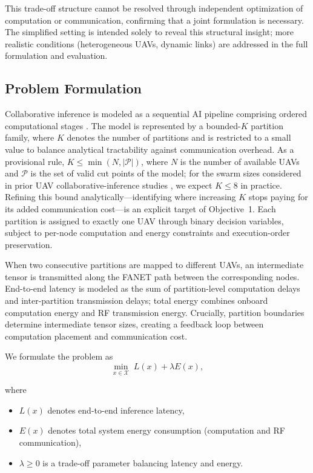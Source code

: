 This trade-off structure cannot be resolved through independent optimization of computation or communication, confirming that a joint formulation is necessary. The simplified setting is intended solely to reveal this structural insight; more realistic conditions (heterogeneous UAVs, dynamic links) are addressed in the full formulation and evaluation.

\subsection*{Problem Formulation}
Collaborative inference is modeled as a sequential AI pipeline comprising ordered computational stages \cite{kang2017neurosurgeon,matsubara2022split}. The model is represented by a bounded-$K$ partition family, where $K$ denotes the number of partitions and is restricted to a small value to balance analytical tractability against communication overhead. As a provisional rule, $K \le \min(N, |\mathcal{P}|)$, where $N$ is the number of available UAVs and $\mathcal{P}$ is the set of valid cut points of the model; for the swarm sizes considered in prior UAV collaborative-inference studies \cite{qu2024elastic,dhuheir2023llhr}, we expect $K \le 8$ in practice. Refining this bound analytically---identifying where increasing $K$ stops paying for its added communication cost---is an explicit target of Objective~1. Each partition is assigned to exactly one UAV through binary decision variables, subject to per-node computation and energy constraints and execution-order preservation.

When two consecutive partitions are mapped to different UAVs, an intermediate tensor is transmitted along the FANET path between the corresponding nodes. End-to-end latency is modeled as the sum of partition-level computation delays and inter-partition transmission delays; total energy combines onboard computation energy and RF transmission energy. Crucially, partition boundaries determine intermediate tensor sizes, creating a feedback loop between computation placement and communication cost.

We formulate the problem as
\[
\min_{x \in \mathcal{X}} \; L(x) + \lambda E(x),
\]

where
\begin{itemize}
    \item $L(x)$ denotes end-to-end inference latency,
    \item $E(x)$ denotes total system energy consumption (computation and RF communication),
    \item $\lambda \geq 0$ is a trade-off parameter balancing latency and energy.
\end{itemize}

